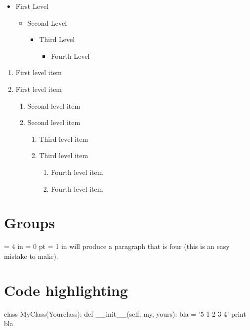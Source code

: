\documentclass[12pt,letterpaper,titlepage]{report}
\begin{document}
\begin{itemize}
	\item  First Level
	      \begin{itemize}
		      \item  Second Level
		            \begin{itemize}
			            \item  Third Level
			                  \begin{itemize}
				                  \item  Fourth Level
			                  \end{itemize}
		            \end{itemize}
	      \end{itemize}
\end{itemize}
\begin{enumerate}
	\item First level item
	\item First level item
	      \begin{enumerate}
		      \item Second level item
		      \item Second level item
		            \begin{enumerate}
			            \item Third level item
			            \item Third level item
			                  \begin{enumerate}
				                  \item Fourth level item
				                  \item Fourth level item
			                  \end{enumerate}
		            \end{enumerate}
	      \end{enumerate}
\end{enumerate}

\section{Groups}
 {
  \hsize = 4 in
  \parindent = 0 pt
  \leftskip = 1 in
  will produce a paragraph that is four
  (this is an easy mistake to make).
  \par
 }


\section{Code highlighting}

\begin{python}
	class MyClass(Yourclass):
	def __init__(self, my, yours):
	bla = '5 1 2 3 4'
	print bla
\end{python}
\end{document}
